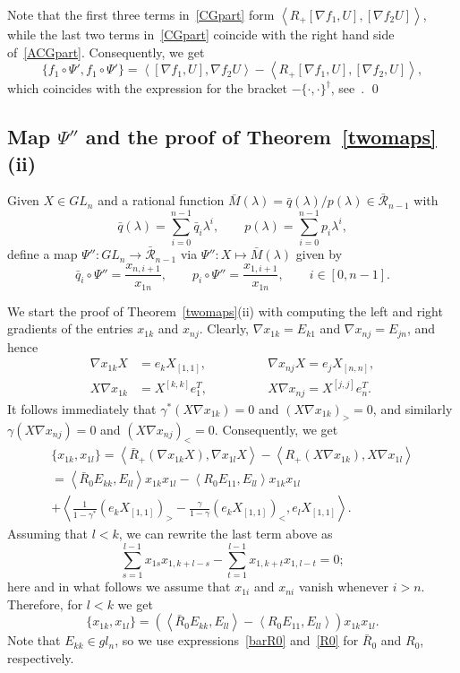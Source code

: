 \documentclass{amsart}
\theoremstyle{definition}
\theoremstyle{remark}
\numberwithin{equation}{section}
\numberwithin{theorem}{section}
\def\RR{{\mathcal R}}
\def\nablac{{\nabla}}
\def\Poi{{\{{\cdot},{\cdot}\}}}
\begin{document}
Note that the first three terms in~\eqref{CGpart} form $\left\langle R_+[\nablac f_1,U], [\nablac f_2U]\right\rangle$, 
while the last two terms in~\eqref{CGpart} coincide with the right hand side of~\eqref{ACGpart}. Consequently, we get
\[
\{f_1\circ \Psi',f_1\circ \Psi'\}=\left\langle  [\nablac f_1, U],\nablac f_2 U\right\rangle-\left\langle R_+[\nablac f_1,U], [\nablac f_2,U]\right\rangle,
\]
which coincides with the expression for the bracket $-\Poi^\dag$, see~\cite[Eq.~(5.6)]{GSVdouble}. \qed


\subsection{Map $\Psi''$ and the proof of Theorem~\ref{twomaps}(ii)} Given $X\in GL_n$ and a rational function
$\bar M(\lambda)=\bar q(\lambda)/p(\lambda)\in\bar \RR_{n-1}$ with
\begin{equation}\label{qandp}
\bar q(\lambda)=\sum_{i=0}^{n-1}\bar q_i\lambda^i,\qquad p(\lambda)=\sum_{i=0}^{n-1}p_i\lambda^i,
\end{equation}
define a map $\Psi'': GL_n\to\bar \RR_{n-1}$ via $\Psi'': X\mapsto \bar M(\lambda)$ given by
\[
\bar q_i\circ\Psi''=\frac{x_{n,i+1}}{x_{1n}},\qquad p_i\circ\Psi''=\frac{x_{1,i+1}}{x_{1n}}, \qquad i\in[0,n-1]. 
\]


We start the proof of Theorem~\ref{twomaps}(ii) with computing the left and right gradients of the entries $x_{1k}$ and 
$x_{nj}$. Clearly,
$\nabla x_{1k}=E_{k1}$ and $\nabla x_{nj}=E_{jn}$, and hence
\begin{equation}\label{gradientsforx}
\begin{alignedat}{2}
\nabla  x_{1k}X&=e_kX_{[1,1]},\qquad\qquad &\nabla x_{nj}X=e_jX_{[n,n]},\\
X\nabla x_{1k}&=X^{[k,k]}e_1^T,\qquad\qquad &X\nabla x_{nj}=X^{[j,j]}e_n^T.
\end{alignedat}
\end{equation}
It follows immediately that $\gamma^*(X\nabla x_{1k})=0$ and $(X\nabla x_{1k})_>=0$, and similarly
$\gamma(X\nabla x_{nj})=0$ and $(X\nabla x_{nj})_<=0$. Consequently, we get
\begin{multline*}
 \{x_{1k},x_{1l}\}=\left\langle \bar R_+(\nabla x_{1k}X),\nabla x_{1l}X\right\rangle-
\left\langle R_+(X\nabla x_{1k}),X\nabla x_{1l}\right\rangle\\=
\left\langle\bar R_0 E_{kk},E_{ll}\right\rangle x_{1k}x_{1l}
-\left\langle R_0 E_{11},E_{ll}\right\rangle x_{1k}x_{1l}\\+
\left\langle \frac1{1-\gamma^*} (e_kX_{[1,1]})_>-\frac{\gamma}{1-\gamma}(e_kX_{[1,1]})_<,e_lX_{[1,1]}\right\rangle.
\end{multline*}
Assuming that $l<k$, we can rewrite the last term above as
\[
\sum_{s=1}^{l-1} x_{1s}x_{1,k+l-s}-\sum_{t=1}^{l-1} x_{1,k+t}x_{1,l-t}=0;
\]
here and in what follows we assume that $x_{1i}$ and $x_{ni}$ vanish whenever $i>n$.
Therefore, for $l<k$ we get
\[
\{x_{1k},x_{1l}\}=\left(\left\langle\bar R_0 E_{kk},E_{ll}\right\rangle-
\left\langle R_0 E_{11},E_{ll}\right\rangle\right)x_{1k}x_{1l}.
\]
Note that $E_{kk}\in gl_n$, so we use expressions~\eqref{barR0} and~\eqref{R0} for $\bar R_0$ and $R_0$,
respectively. 
\end{document}
